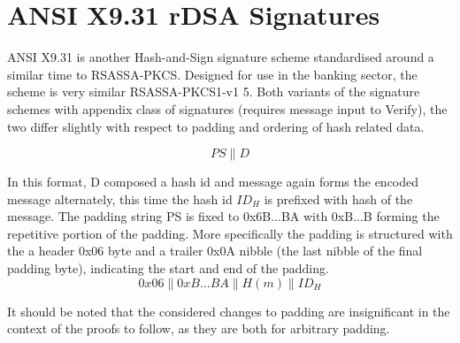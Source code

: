 \documentclass[]{final_report}
\theoremstyle{definition}
\begin{document}
\section{ANSI X9.31 rDSA Signatures}
ANSI X9.31 \cite{ANSI-1998-X9-31} is another Hash-and-Sign signature scheme standardised around a similar time to RSASSA-PKCS. Designed for use in the banking sector, the scheme is very similar RSASSA-PKCS1-v1 5. Both variants of the signature schemes with appendix class of signatures (requires message input to Verify), the two differ slightly with respect to padding and ordering of hash related data.


\[PS\|D\]

In this format, D composed a hash id and message again forms the encoded message alternately, this time the hash id $ID_{H}$ is prefixed with hash of the message. The padding string PS is fixed to 0x6B...BA with 0xB...B forming the repetitive portion of the padding. More specifically the padding is structured with the a header 0x06 byte and a trailer 0x0A nibble (the last nibble of the final padding byte), indicating the start and end of the padding. 
\[0x06\|0xB . . . BA\|H(m)\|ID_{H}\]

It should be noted that the considered changes to padding are insignificant in the context of the proofs to follow, as they are both for arbitrary padding.
\end{document}

